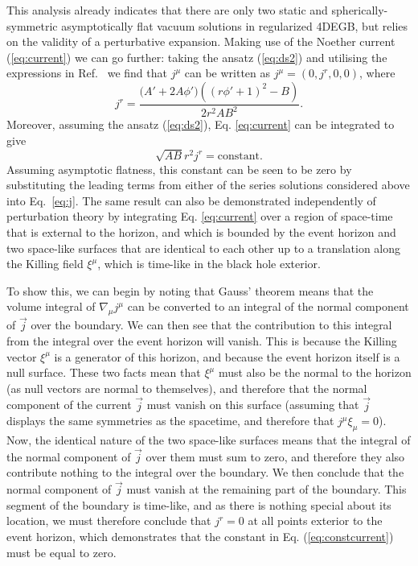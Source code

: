 \documentclass[reprint,amsmath,amssymbGaps,onecolumn,notitlepage,nofootinbib]{revtex4-1}
\begin{document}
This analysis already indicates that there are only two static and spherically-symmetric 
asymptotically flat vacuum solutions in regularized 4DEGB, but relies on the validity of a perturbative expansion. Making use of the Noether current (\ref{eq:current}) we can go further: taking the ansatz (\ref{eq:ds2}) and utilising the expressions in Ref.~\cite{Saravani:2019xwx} we find that $j^\mu$ can be written as $j^\mu = (0, j^r,0,0)$, where
\begin{equation}
j^r = \frac{\Big(A'+2 A \phi '\Big) \left(\left(r \phi '+1\right)^2 - B\right)}{2 r^2 A B^2}.
\label{eq:j}
\end{equation}
Moreover, assuming the ansatz (\ref{eq:ds2}), Eq. \eqref{eq:current} can be integrated to give
\begin{equation}
\sqrt{AB}r^2 j^r = \mbox{constant}.
\label{eq:constcurrent}
\end{equation} 
Assuming asymptotic flatness, this constant can be seen to be zero by substituting the leading terms from either of the series solutions considered above into Eq.~\eqref{eq:j}. The same result can also be demonstrated independently of perturbation theory by integrating Eq. \eqref{eq:current} over a region of space-time that is external to the horizon, and which is bounded by the event horizon and two space-like surfaces that are identical to each other up to a translation along the Killing field $\xi^{\mu}$, which is time-like in the black hole exterior. 

To show this, we can begin by noting that Gauss' theorem means that the volume integral of $\nabla_{\mu} j^{\mu}$ can be converted to an integral of the normal component of $\vec{j}$ over the boundary. We can then see that the contribution to this integral from the integral over the event horizon will vanish. This is because the Killing vector $\xi^{\mu}$ is a generator of this horizon, and because the event horizon itself is a null surface. These two facts mean that $\xi^{\mu}$ must also be the normal to the horizon (as null vectors are normal to themselves), and therefore that the normal component of the current $\vec{j}$ must vanish on this surface (assuming that $\vec{j}$ displays the same symmetries as the spacetime, and therefore that $j^{\mu} \xi_{\mu}=0$). Now, the identical nature of the two space-like surfaces means that the integral of the normal component of $\vec{j}$ over them must sum to zero, and therefore they also contribute nothing to the integral over the boundary. We then conclude that the normal component of $\vec{j}$ must vanish at the remaining part of the boundary. This segment of the boundary is time-like, and as there is nothing special about its location, we must therefore conclude that $j^r=0$ at all points exterior to the event horizon, which demonstrates that the constant in Eq. (\ref{eq:constcurrent}) must be equal to zero.
\end{document}
